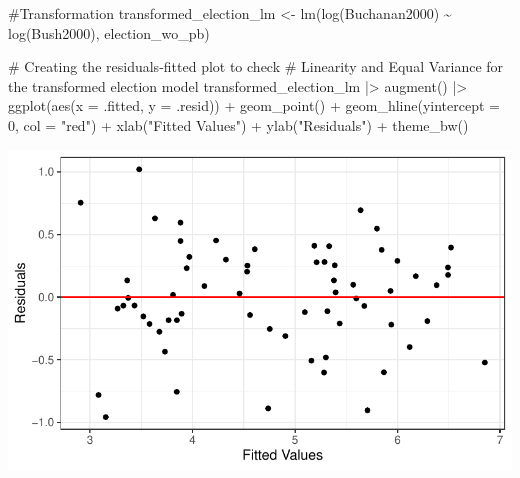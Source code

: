 \documentclass[
  letterpaper,
  DIV=11,
  numbers=noendperiod]{scrartcl}
\newenvironment{Shaded}{\begin{snugshade}}{\end{snugshade}}
\newcommand{\AttributeTok}[1]{\textcolor[rgb]{0.40,0.45,0.13}{#1}}
\newcommand{\CommentTok}[1]{\textcolor[rgb]{0.37,0.37,0.37}{#1}}
\newcommand{\DecValTok}[1]{\textcolor[rgb]{0.68,0.00,0.00}{#1}}
\newcommand{\FunctionTok}[1]{\textcolor[rgb]{0.28,0.35,0.67}{#1}}
\newcommand{\NormalTok}[1]{\textcolor[rgb]{0.00,0.23,0.31}{#1}}
\newcommand{\OtherTok}[1]{\textcolor[rgb]{0.00,0.23,0.31}{#1}}
\newcommand{\SpecialCharTok}[1]{\textcolor[rgb]{0.37,0.37,0.37}{#1}}
\newcommand{\StringTok}[1]{\textcolor[rgb]{0.13,0.47,0.30}{#1}}
\begin{document}
\begin{Shaded}
\begin{Highlighting}[]
\CommentTok{\#Transformation}
\NormalTok{transformed\_election\_lm }\OtherTok{\textless{}{-}} \FunctionTok{lm}\NormalTok{(}\FunctionTok{log}\NormalTok{(Buchanan2000) }\SpecialCharTok{\textasciitilde{}} \FunctionTok{log}\NormalTok{(Bush2000), election\_wo\_pb)}

\CommentTok{\# Creating the residuals{-}fitted plot to check }
\CommentTok{\# Linearity and Equal Variance for the transformed election model}
\NormalTok{transformed\_election\_lm }\SpecialCharTok{|\textgreater{}}
  \FunctionTok{augment}\NormalTok{() }\SpecialCharTok{|\textgreater{}}
  \FunctionTok{ggplot}\NormalTok{(}\FunctionTok{aes}\NormalTok{(}\AttributeTok{x =}\NormalTok{ .fitted, }\AttributeTok{y =}\NormalTok{ .resid)) }\SpecialCharTok{+}
  \FunctionTok{geom\_point}\NormalTok{() }\SpecialCharTok{+}
  \FunctionTok{geom\_hline}\NormalTok{(}\AttributeTok{yintercept =} \DecValTok{0}\NormalTok{, }\AttributeTok{col =} \StringTok{"red"}\NormalTok{) }\SpecialCharTok{+}
  \FunctionTok{xlab}\NormalTok{(}\StringTok{"Fitted Values"}\NormalTok{) }\SpecialCharTok{+}
  \FunctionTok{ylab}\NormalTok{(}\StringTok{"Residuals"}\NormalTok{) }\SpecialCharTok{+}
  \FunctionTok{theme\_bw}\NormalTok{()}
\end{Highlighting}
\end{Shaded}

\includegraphics{SDS-291-case-study-1_files/figure-pdf/unnamed-chunk-4-4.pdf}
\end{document}
